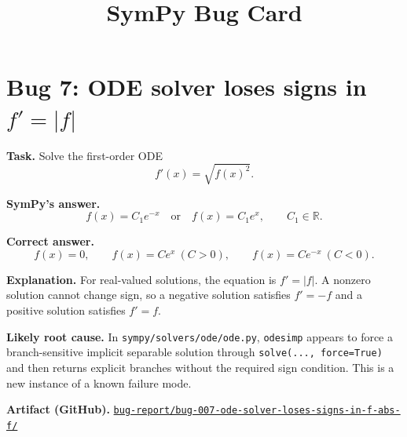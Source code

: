 \documentclass[11pt]{article}
\title{SymPy Bug Card}
\author{}
\date{}
\newcommand{\artifactrepo}{https://github.com/TODO-org/TODO-repo}
\newcommand{\bugbundle}[1]{\href{\artifactrepo/tree/main/bug-report/#1}{\nolinkurl{bug-report/#1/}}}
\begin{document}
\maketitle

\section*{Bug 7: ODE solver loses signs in \texorpdfstring{$f'=|f|$}{f' = Abs(f)}}

\begin{counterexamplebox}
\textbf{Task.} Solve the first-order ODE
\[
  f'(x)=\sqrt{f(x)^2}.
\]

\medskip
\textbf{SymPy's answer.}
\[
  f(x)=C_1e^{-x}\quad\text{or}\quad f(x)=C_1e^x,
  \qquad C_1\in\mathbb{R}.
\]

\medskip
\textbf{Correct answer.}
\[
  f(x)=0,\qquad f(x)=C e^x\ (C>0),\qquad
  f(x)=C e^{-x}\ (C<0).
\]

\medskip
\textbf{Explanation.} For real-valued solutions, the equation is
\(f'=|f|\).  A nonzero solution cannot change sign, so a negative solution
satisfies \(f'=-f\) and a positive solution satisfies \(f'=f\).  

\medskip
\textbf{Likely root cause.} In \nolinkurl{sympy/solvers/ode/ode.py},
\texttt{odesimp} appears to force a branch-sensitive implicit separable
solution through \texttt{solve(..., force=True)} and then returns explicit
branches without the required sign condition.  This is a new instance of a
known failure mode.

\medskip
\textbf{Artifact (GitHub).} \bugbundle{bug-007-ode-solver-loses-signs-in-f-abs-f}
\end{counterexamplebox}
\end{document}
